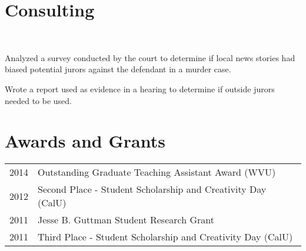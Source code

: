 \documentclass[letterpaper]{deedy-resume} %
\begin{document}
\begin{minipage}[t]{0.63\textwidth}
\sectionspace %

\section{Consulting}
\\
\begin{tightitemize}
\item Analyzed a survey conducted by the court to determine if
  local news stories had biased potential jurors against the defendant in a
  murder case.
\item Wrote a report used as evidence in a hearing to determine if
  outside jurors needed to be used.
\end{tightitemize}

\sectionspace %


\vspace{-3pt}
\section{Awards and Grants} 

\begin{tabular}{rl}
2014 & Outstanding Graduate Teaching Assistant Award (WVU)\\
2012 & Second Place - Student Scholarship and Creativity Day (CalU)\\
2011 & Jesse B. Guttman Student Research Grant\\
2011 & Third Place - Student Scholarship and Creativity Day (CalU)\\
\end{tabular}

\sectionspace %




\end{minipage} %


\end{document}
